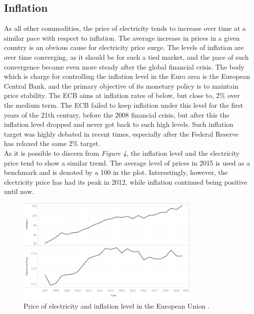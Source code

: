 \documentclass{book}
\begin{document}
\subsection*{Inflation}

As all other commodities, the price of electricity tends to increase over time at a similar pace with respect to inflation. The average increase in prices in a given country is an obvious cause for electricity price surge. The levels of inflation are over time converging, as it should be for such a tied market, and the pace of such convergence became even more steady after the global financial crisis. \cite{brovz2018dynamics} The body which is charge for controlling the inflation level in the Euro area is the European Central Bank, and the primary objective of its monetary policy is to maintain price stability. The ECB aims at inflation rates of below, but close to, 2\% over the medium term. The ECB failed to keep inflation under this level for the first years of the 21th century, before the 2008 financial crisis, but after this the inflation level dropped and never got back to such high levels. Such inflation target was highly debated in recent times, especially after the Federal Reserve has relaxed the same 2\% target.\\

As it is possible to discern from \textit{Figure 4}, the inflation level and the electricity price tend to show a similar trend. The average level of prices in 2015 is used as a benchmark and is denoted by a 100 in the plot. Interestingly, however, the electricity price has had its peak in 2012, while inflation continued being positive until now. 

\bigskip
\begin{figure}[H]
\begin{center}
\captionsetup{justification=centering}
\includegraphics[width=0.8\textwidth]{Images/inf.png}
\caption{Price of electricity and inflation level in the European Union . }
\end{center}
\end{figure}
\bigskip
\end{document}
